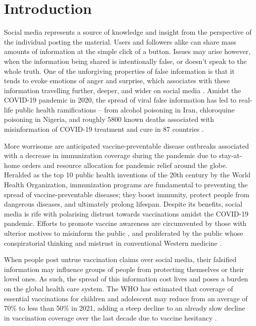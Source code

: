 \documentclass[12pt]{article}
\begin{document}
\section{Introduction} \label{sec:intro}

Social media represents a source of knowledge and insight from the perspective of the individual posting the material. Users and followers alike can share mass amounts of information at the simple click of a button. Issues may arise however, when the information being shared is intentionally false, or doesn’t speak to the whole truth.  One of the unforgiving properties of false information is that it tends to evoke emotions of anger and surprise, which associates with these information travelling further, deeper, and wider on social media \cite{vosoughi-2018}. Amidst the COVID-19 pandemic in 2020, the spread of viral false information has led to real-life public health ramifications – from alcohol poisoning in Iran, chloroquine poisoning in Nigeria, and roughly 5800 known deaths associated with misinformation of COVID-19 treatment and cure in 87 countries \cite{islam-2020}.   


More worrisome are anticipated vaccine-preventable disease outbreaks associated with a decrease in immunization coverage during the pandemic due to stay-at-home orders and resource allocation for pandemic relief around the globe. Heralded as the top 10 public health inventions of the 20th century by the World Health Organization, immunization programs are fundamental to preventing the spread of vaccine-preventable diseases; they boost immunity, protect people from dangerous diseases, and ultimately prolong lifespan. Despite its benefits, social media is rife with polarising distrust towards vaccinations amidst the COVID-19 pandemic. Efforts to promote vaccine awareness are circumvented by those with ulterior motives to misinform the public , and proliferated by the public whose conspiratorial thinking and mistrust in conventional Western medicine \cite{hornsey-harris-2018,hornsey-lobera-2020}. 

When people post untrue vaccination claims over social media, their falsified information may influence groups of people from protecting themselves or their loved ones.  As such, the spread of this information cost lives and poses a burden on the global health care system. The WHO has estimated that coverage of essential vaccinations for children and adolescent may reduce from an average of 70\% to less than 50\% in 2021, adding a steep decline to an already slow decline in vaccination coverage over the last decade due to vaccine hesitancy \cite{WHO-top10-2020} . 
\end{document}
